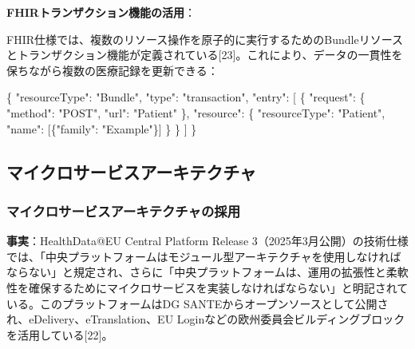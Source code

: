 \documentclass[
  a4paper,
  a4paper,
  11pt]{ltjsbook}
\newenvironment{Shaded}{\begin{snugshade}}{\end{snugshade}}
\newcommand{\DataTypeTok}[1]{\textcolor[rgb]{0.68,0.00,0.00}{#1}}
\newcommand{\FunctionTok}[1]{\textcolor[rgb]{0.28,0.35,0.67}{#1}}
\newcommand{\OtherTok}[1]{\textcolor[rgb]{0.00,0.23,0.31}{#1}}
\newcommand{\StringTok}[1]{\textcolor[rgb]{0.13,0.47,0.30}{#1}}
\begin{document}
\textbf{FHIRトランザクション機能の活用}：

FHIR仕様では、複数のリソース操作を原子的に実行するためのBundleリソースとトランザクション機能が定義されている{[}23{]}。これにより、データの一貫性を保ちながら複数の医療記録を更新できる：

\begin{Shaded}
\begin{Highlighting}[]
\FunctionTok{\{}
  \DataTypeTok{"resourceType"}\FunctionTok{:} \StringTok{"Bundle"}\FunctionTok{,}
  \DataTypeTok{"type"}\FunctionTok{:} \StringTok{"transaction"}\FunctionTok{,}
  \DataTypeTok{"entry"}\FunctionTok{:} \OtherTok{[}
    \FunctionTok{\{}
      \DataTypeTok{"request"}\FunctionTok{:} \FunctionTok{\{}
        \DataTypeTok{"method"}\FunctionTok{:} \StringTok{"POST"}\FunctionTok{,}
        \DataTypeTok{"url"}\FunctionTok{:} \StringTok{"Patient"}
      \FunctionTok{\},}
      \DataTypeTok{"resource"}\FunctionTok{:} \FunctionTok{\{}
        \DataTypeTok{"resourceType"}\FunctionTok{:} \StringTok{"Patient"}\FunctionTok{,}
        \DataTypeTok{"name"}\FunctionTok{:} \OtherTok{[}\FunctionTok{\{}\DataTypeTok{"family"}\FunctionTok{:} \StringTok{"Example"}\FunctionTok{\}}\OtherTok{]}
      \FunctionTok{\}}
    \FunctionTok{\}}
  \OtherTok{]}
\FunctionTok{\}}
\end{Highlighting}
\end{Shaded}

\subsection{マイクロサービスアーキテクチャ}\label{ux30deux30a4ux30afux30edux30b5ux30fcux30d3ux30b9ux30a2ux30fcux30adux30c6ux30afux30c1ux30e3}

\subsubsection{マイクロサービスアーキテクチャの採用}\label{ux30deux30a4ux30afux30edux30b5ux30fcux30d3ux30b9ux30a2ux30fcux30adux30c6ux30afux30c1ux30e3ux306eux63a1ux7528}

\textbf{事実}：HealthData@EU Central Platform Release
3（2025年3月公開）の技術仕様では、「中央プラットフォームはモジュール型アーキテクチャを使用しなければならない」と規定され、さらに「中央プラットフォームは、運用の拡張性と柔軟性を確保するためにマイクロサービスを実装しなければならない」と明記されている。このプラットフォームはDG
SANTEからオープンソースとして公開され、eDelivery、eTranslation、EU
Loginなどの欧州委員会ビルディングブロックを活用している{[}22{]}。
\end{document}
